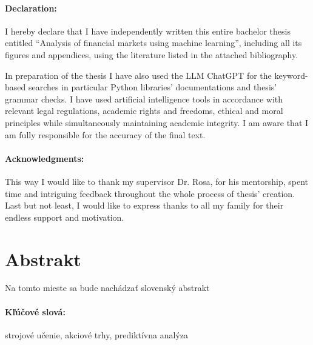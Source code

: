 \documentclass[12pt, oneside]{book}  %
\def\mfnazov{Analysis of financial markets using machine learning}
\begin{document}




\newpage
\pagestyle{plain}
\paragraph{Declaration:}
I hereby declare that I have independently written this entire
bachelor thesis entitled ``\mfnazov'', including all its
figures and appendices, using the literature listed in the attached
bibliography.

In preparation of the thesis I have also used the LLM ChatGPT
for the keyword-based searches in particular Python libraries' documentations 
and thesis' grammar checks. I have used artificial intelligence tools in accordance with relevant
legal regulations, academic rights and freedoms, ethical and moral
principles while simultaneously maintaining academic integrity. I am
aware that I am fully responsible for the accuracy of the final text.

\paragraph{Acknowledgments:} This way I would like to thank my supervisor Dr. Rosa, for his mentorship, spent time and intriguing feedback throughout the whole process of thesis' creation.
Last but not least, I would like to express thanks to all my family for their endless support and motivation.


\newpage 
\section*{Abstrakt}


Na tomto mieste sa bude nachádzať slovenský abstrakt

\paragraph*{Kľúčové slová:} strojové učenie, akciové trhy, prediktívna analýza


\newpage 
\end{document}
